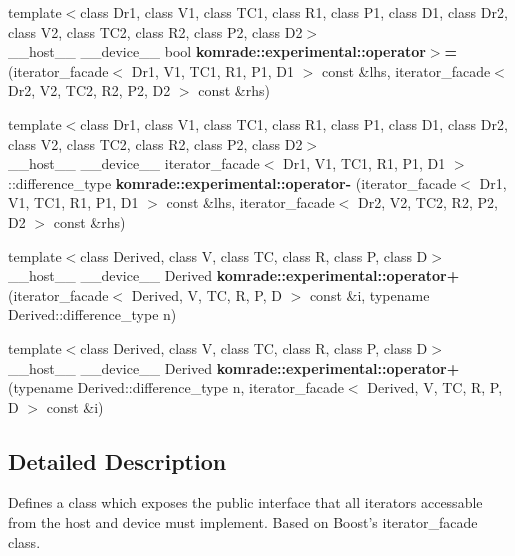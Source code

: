 \begin{CompactItemize}
\item 
{\footnotesize template$<$class Dr1, class V1, class TC1, class R1, class P1, class D1, class Dr2, class V2, class TC2, class R2, class P2, class D2$>$ }\\\_\-\_\-host\_\-\_\- \_\-\_\-device\_\-\_\- bool \textbf{komrade::experimental::operator$>$=} (iterator\_\-facade$<$ Dr1, V1, TC1, R1, P1, D1 $>$ const \&lhs, iterator\_\-facade$<$ Dr2, V2, TC2, R2, P2, D2 $>$ const \&rhs)\label{namespacekomrade_1_1experimental_6c56473e48975474e0dcc916baebb698}

\item 
{\footnotesize template$<$class Dr1, class V1, class TC1, class R1, class P1, class D1, class Dr2, class V2, class TC2, class R2, class P2, class D2$>$ }\\\_\-\_\-host\_\-\_\- \_\-\_\-device\_\-\_\- iterator\_\-facade$<$ Dr1, V1, TC1, R1, P1, D1 $>$::difference\_\-type \textbf{komrade::experimental::operator-} (iterator\_\-facade$<$ Dr1, V1, TC1, R1, P1, D1 $>$ const \&lhs, iterator\_\-facade$<$ Dr2, V2, TC2, R2, P2, D2 $>$ const \&rhs)\label{namespacekomrade_1_1experimental_08035ee15fceef58d27bb12d82219dc1}

\item 
{\footnotesize template$<$class Derived, class V, class TC, class R, class P, class D$>$ }\\\_\-\_\-host\_\-\_\- \_\-\_\-device\_\-\_\- Derived \textbf{komrade::experimental::operator+} (iterator\_\-facade$<$ Derived, V, TC, R, P, D $>$ const \&i, typename Derived::difference\_\-type n)\label{namespacekomrade_1_1experimental_53377102bc2bae7e50f4ed68d0f30ef2}

\item 
{\footnotesize template$<$class Derived, class V, class TC, class R, class P, class D$>$ }\\\_\-\_\-host\_\-\_\- \_\-\_\-device\_\-\_\- Derived \textbf{komrade::experimental::operator+} (typename Derived::difference\_\-type n, iterator\_\-facade$<$ Derived, V, TC, R, P, D $>$ const \&i)\label{namespacekomrade_1_1experimental_b8515494d7e4d8984d2ba4e8af3fedfd}

\end{CompactItemize}


\subsection{Detailed Description}
Defines a class which exposes the public interface that all iterators accessable from the host and device must implement. Based on Boost's iterator\_\-facade class. 

